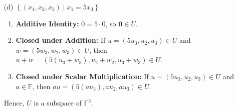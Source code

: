 \begin{solution}
\begin{enumerate}
    \item[(d)] \(\left\{ \left( x_{1}, x_{2}, x_{3} \right) \mid x_{1} = 5x_{3} \right\}\)
    \begin{enumerate}
        \item \textbf{Additive Identity:} \(0 = 5 \cdot 0\), so \( \mathbf{0} \in U \).
        \item \textbf{Closed under Addition:} If \(u = (5u_{3}, u_{2}, u_{3}) \in U\) and \(w = (5w_{3}, w_{2}, w_{3}) \in U\), then \(u + w = (5(u_{3} + w_{3}), u_{2} + w_{2}, u_{3} + w_{3}) \in U\).
        \item \textbf{Closed under Scalar Multiplication:} If \(u = (5u_{3}, u_{2}, u_{3}) \in U\) and \(a \in \mathbb{F}\), then \(au = (5(au_{3}), au_{2}, au_{3}) \in U\).
    \end{enumerate}
    Hence, \( U \) is a subspace of \(\mathbb{F}^{3}\).
\end{enumerate}
\end{solution}

